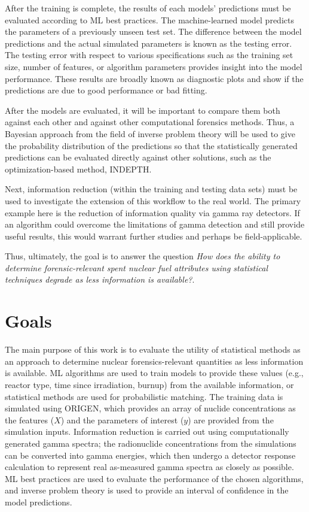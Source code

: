 After the training is complete, the results of each models' predictions must be
evaluated according to \gls{ML} best practices.  The machine-learned
model predicts the parameters of a previously unseen test set.  The difference
between the model predictions and the actual simulated parameters is known as
the testing error.  The testing error with respect to various specifications
such as the training set size, number of features, or algorithm parameters
provides insight into the model performance. These results are broadly known as
diagnostic plots and show if the predictions are due to good performance or bad
fitting. 

After the models are evaluated, it will be important to compare them both
against each other and against other computational forensics methods. Thus, a
Bayesian approach from the field of inverse problem theory will be used to give
the probability distribution of the predictions so that the statistically
generated predictions can be evaluated directly against other solutions, such
as the optimization-based method, \gls{INDEPTH}. 

Next, information reduction (within the training and testing data sets) must be
used to investigate the extension of this workflow to the real world. The
primary example here is the reduction of information quality via gamma ray
detectors.  If an algorithm could overcome the limitations of gamma detection
and still provide useful results, this would warrant further studies and
perhaps be field-applicable.

Thus, ultimately, the goal is to answer the question \textit{How does the
ability to determine forensic-relevant spent nuclear fuel attributes using
statistical techniques degrade as less information is available?}. 

\section{Goals}

The main purpose of this work is to evaluate the utility of statistical methods
as an approach to determine nuclear forensics-relevant quantities as less
information is available. \Gls{ML} algorithms are used to train models to
provide these values (e.g., reactor type, time since irradiation, burnup) from
the available information, or statistical methods are used for probabilistic
matching.  The training data is simulated using \gls{ORIGEN}, which provides an
array of nuclide concentrations as the features ($X$) and the parameters of
interest ($y$) are provided from the simulation inputs.  Information reduction
is carried out using computationally generated gamma spectra; the radionuclide
concentrations from the simulations can be converted into gamma energies, which
then undergo a detector response calculation to represent real as-measured
gamma spectra as closely as possible.  \Gls{ML} best practices are used to
evaluate the performance of the chosen algorithms, and inverse problem theory
is used to provide an interval of confidence in the model predictions.

